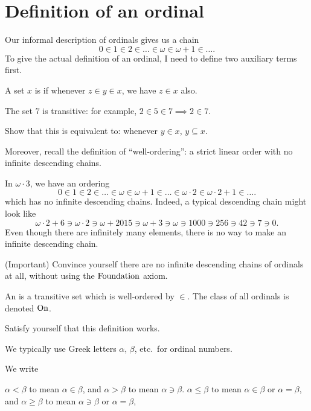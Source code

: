 \section{Definition of an ordinal}
Our informal description of ordinals gives us a chain
\[ 0 \in 1 \in 2 \in \dots \in \omega \in \omega+1 \in \dots. \]
To give the actual definition of an ordinal, I need to define two auxiliary terms first.
\begin{definition}
	A set $x$ is  if whenever $z \in y \in x$, we have $z \in x$ also.
\end{definition}
\begin{example}
	[$7$ is transitive]
	The set $7$ is transitive: for example, $2 \in 5 \in 7 \implies 2 \in 7$.
\end{example}
\begin{ques}
	Show that this is equivalent to: whenever $y \in x$, $y \subseteq x$.
\end{ques}
Moreover, recall the definition of ``well-ordering'': a strict linear order
with no infinite descending chains.
\begin{example}
	In $\omega \cdot 3$, we have an ordering
	\[ 0 \in 1 \in 2 \in \dots \in \omega \in \omega+1 \in \dots
		\in \omega \cdot 2 \in \omega \cdot 2 + 1 \in \dots. \]
	which has no infinite descending chains.
	Indeed, a typical descending chain might look like
	\[ \omega \cdot 2 + 6 \ni \omega \cdot 2 \ni
		\omega + 2015 \ni \omega+3 \ni \omega \ni 1000 \ni 256 \ni 42 \ni 7 \ni 0. \]
	Even though there are infinitely many elements, there is no way
	to make an infinite descending chain.
\end{example}
\begin{exercise}
	(Important)
	Convince yourself there are no infinite
	descending chains of ordinals at all,
	without using the $\mathrm{Foundation}$ axiom.
\end{exercise}

\begin{definition}
	An  is a transitive set which is well-ordered by $\in$.
	The class of all ordinals is denoted $\mathrm{On}$.
\end{definition}

\begin{ques}
	Satisfy yourself that this definition works.
\end{ques}

We typically use Greek letters $\alpha$, $\beta$, etc.\ for ordinal numbers.
\begin{definition}
	We write
	\begin{itemize}
		\ii $\alpha < \beta$ to mean $\alpha \in \beta$,
		and $\alpha > \beta$ to mean $\alpha \ni \beta$.
		\ii $\alpha \le \beta$ to mean $\alpha \in \beta$ or $\alpha = \beta$,
		and $\alpha \ge \beta$ to mean $\alpha \ni \beta$ or $\alpha = \beta$,
	\end{itemize}
\end{definition}

